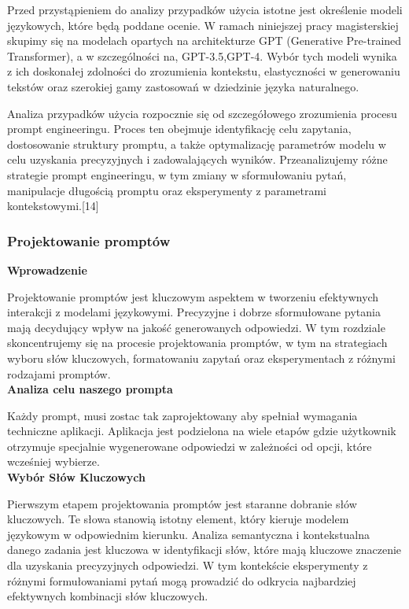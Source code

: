 Przed przystąpieniem do analizy przypadków użycia istotne jest określenie modeli językowych, które będą poddane ocenie. W ramach niniejszej pracy magisterskiej skupimy się na modelach opartych na architekturze GPT (Generative Pre-trained Transformer), a w szczególności na, GPT-3.5,GPT-4. Wybór tych modeli wynika z ich doskonałej zdolności do zrozumienia kontekstu, elastyczności w generowaniu tekstów oraz szerokiej gamy zastosowań w dziedzinie języka naturalnego.
 
Analiza przypadków użycia rozpocznie się od szczegółowego zrozumienia procesu prompt engineeringu. Proces ten obejmuje identyfikację celu zapytania, dostosowanie struktury promptu, a także optymalizację parametrów modelu w celu uzyskania precyzyjnych i zadowalających wyników. Przeanalizujemy różne strategie prompt engineeringu, w tym zmiany w sformułowaniu pytań, manipulacje długością promptu oraz eksperymenty z parametrami kontekstowymi.[14]

\subsubsection{Projektowanie promptów}

\noindent\textbf{Wprowadzenie}

Projektowanie promptów jest kluczowym aspektem w tworzeniu efektywnych interakcji z modelami językowymi. Precyzyjne i dobrze sformułowane pytania mają decydujący wpływ na jakość generowanych odpowiedzi. W tym rozdziale skoncentrujemy się na procesie projektowania promptów, w tym na strategiach wyboru słów kluczowych, formatowaniu zapytań oraz eksperymentach z różnymi rodzajami promptów.
\\

\noindent\textbf{Analiza celu naszego prompta}

Każdy prompt, musi zostac tak zaprojektowany aby spełniał wymagania techniczne aplikacji.
Aplikacja jest podzielona na wiele etapów gdzie użytkownik otrzymuje specjalnie wygenerowane odpowiedzi w zależności od opcji, które wcześniej wybierze.
\\

\noindent\textbf{Wybór Słów Kluczowych}

Pierwszym etapem projektowania promptów jest staranne dobranie słów kluczowych. Te słowa stanowią istotny element, który kieruje modelem językowym w odpowiednim kierunku. Analiza semantyczna i kontekstualna danego zadania jest kluczowa w identyfikacji słów, które mają kluczowe znaczenie dla uzyskania precyzyjnych odpowiedzi. W tym kontekście eksperymenty z różnymi formułowaniami pytań mogą prowadzić do odkrycia najbardziej efektywnych kombinacji słów kluczowych.
\\

